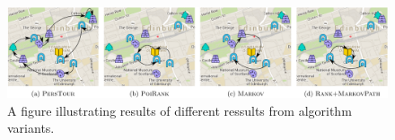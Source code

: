 \documentclass{sig-alternate-05-2015}
\begin{document}




\begin{figure}[tb]
	\centering
	\includegraphics[width=\textwidth]{fig/example-tour}
	\caption{A figure illustrating results of different ressults from algorithm variants. 
}
	\label{fig:exampleresult}
\end{figure}








\end{document}
